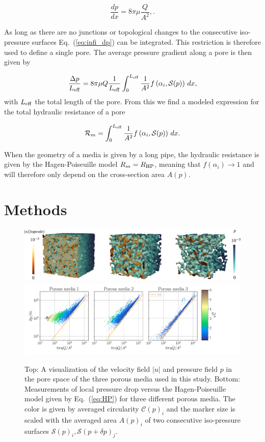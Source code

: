 \documentclass[draft]{agujournal2019}
\begin{document}
\begin{equation}
	\frac{d p}{d x} = 8 \pi \mu\frac{Q}{A^2}, \label{eq:HP}.
\end{equation} 

As long as there are no junctions or topological changes to the consecutive iso-pressure surfaces Eq.~(\ref{eq:infi_dp}) can be integrated. This restriction is therefore used to define a single pore. The average pressure gradient along a pore is then given by

\begin{equation}
	\frac{\Delta p}{L_{\rm{eff}}} =  8\pi \mu  Q \frac{1}{L_{\rm{eff}}}\int^{L_{\rm{eff}}}_{0}\frac{1}{A^2}f\left(\alpha_i,\mathcal{S}(p)\right)\,dx,
\end{equation}
with $L_{\rm{eff}}$ the total length of the pore. From this we find a modeled expression for the total hydraulic resistance of a pore

\begin{equation}
	\mathcal{R}_m = \int^{L_{\rm{eff}}}_{0}\frac{1}{A^2}f\left(\alpha_i,\mathcal{S}(p)\right)\,dx\label{eq:R_model}.
\end{equation}

When the geometry of a media is given by a long pipe, the hydraulic resistance is given by the Hagen-Poiseuille model $R_m = R_{\rm{HP}}$, meaning that $f(\alpha_i)\rightarrow 1$ and will therefore only depend on the cross-section area $A(p)$.


\section{Methods}
\begin{figure}[t!]
\includegraphics[width=1.0\linewidth]{figures/DNS_overview.eps}
\includegraphics[width=1.2\linewidth]{figures/infi_dpdx_3.pdf}
\caption{Top: A visualization of the velocity field $|u|$ and pressure field $p$ in the pore space of the three porous media used in this study. Bottom: Measurements of local pressure drop versus the Hagen-Poiseuille model given by Eq.~(\ref{eq:HP}) for three different porous media. The color is given by averaged circularity $\mathcal{C}(p)_i$ and the marker size is scaled with the averaged area $A(p)_i$ of two consecutive iso-pressure surfaces $\mathcal{S}(p)_i,\mathcal{S}(p+\delta p)_j$. }
\label{fig:DNS}
\end{figure}
\end{document}
